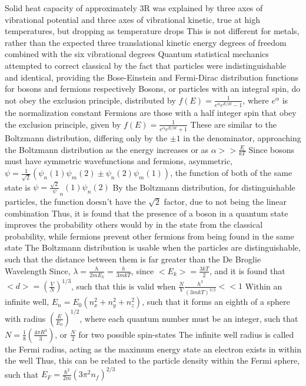 \documentclass[11 pt, twoside]{article}
\newenvironment{outline*}
{
	\begin{outline}[enumerate]
	}
	{\end{outline}
}
\begin{document}
\begin{outline*}
		\3 Solid heat capacity of approximately 3R was explained by three axes of vibrational potential and three axes of vibrational kinetic, true at high temperatures, but dropping as temperature drops
			\4 This is not different for metals, rather than the expected three translational kinetic energy degrees of freedom combined with the six vibrational degrees
\1 Quantum statistical mechanics attempted to correct classical by the fact that particles were indistinguishable and identical, providing the Bose-Einstein and Fermi-Dirac distribution functions for bosons and fermions respectively
	\2 Bosons, or particles with an integral spin, do not obey the exclusion principle, distributed by $f(E) = \frac{1}{e^{\alpha}e^{E/kt} - 1}$, where $e^{\alpha}$ is the normalization constant
		\3 Fermions are those with a half integer spin that obey the exclusion principle, given by $f(E) = \frac{1}{e^{\alpha}e^{E/kt} + 1}$
	\2 These are similar to the Boltzmann distribution, differing only by the $\pm 1$ in the denominator, approaching the Boltzmann distribution as the energy increases or as $\alpha >> \frac{E}{kT}$
		\3 Since bosons must have symmetric wavefunctions and fermions, asymmetric, $\psi = \frac{1}{\sqrt{2}}(\psi_n(1)\psi_m(2) \pm \psi_n(2)\psi_m(1))$, the function of both of the same state is $\psi = \frac{\sqrt{2}}\psi_n(1)\psi_n(2)$
		\3 By the Boltzmann distribution, for distinguishable particles, the function doesn't have the $\sqrt{2}$ factor, due to not being the linear combination
		\3 Thus, it is found that the presence of a boson in a quantum state improves the probability others would by in the state from the classical probability, while fermions prevent other fermions from being found in the same state
	\2 The Boltzmann distribution is usable when the particles are distinguishable, such that the distance between them is far greater than the De Broglie Wavelength
		\3 Since, $\lambda = \frac{h}{2mE_k} = \frac{h}{3mkT}$, since $<E_k> = \frac{3kT}{2}$, and it is found that $<d> = (\frac{V}{N})^{1/3}$, such that this is valid when $\frac{N}{V}\frac{h^3}{(3mkT)^{3/2}} << 1$
		\3 Within an infinite well, $E_n = E_0(n_x^2 + n_y^2 + n_z^2)$, such that it forms an eighth of a sphere with radius $(\frac{E}{E_0})^{1/2}$, where each quantum number must be an integer, such that $N = \frac{1}{8}(\frac{4\pi R^3}{3})$, or $\frac{N}{2}$ for two possible spin-states
			\4 The infinite well radius is called the Fermi radius, acting as the maximum energy state an electron exists in within the well
			\4 Thus, this can be related to the particle density within the Fermi sphere, such that $E_F = \frac{\hbar^2}{2m}(3\pi^2n_f)^{2/3}$

\end{outline*}
\end{document}
